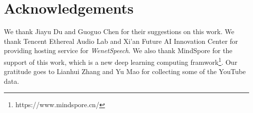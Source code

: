 \documentclass{article}
\begin{document}
\vspace{-1em}
\section{Acknowledgements}
\vspace{-1em}
We thank Jiayu Du and Guoguo Chen for their suggestions on this work.
We thank Tencent Ethereal Audio Lab and Xi'an Future AI Innovation Center for providing hosting service for \textit{WenetSpeech}. We also thank MindSpore for the support of this work, which is a new deep learning computing framwork\footnote{https://www.mindspore.cn/}.
Our gratitude goes to Lianhui Zhang and Yu Mao for collecting some of the YouTube data.


\newpage
\scriptsize


\newlength{\bibitemsep}\setlength{\bibitemsep}{.15\baselineskip plus .05\baselineskip minus .05\baselineskip}
\newlength{\bibparskip}\setlength{\bibparskip}{0pt}
\let\oldthebibliography\thebibliography
\renewcommand\thebibliography[1]{\oldthebibliography{#1}\setlength{\parskip}{\bibitemsep}\setlength{\itemsep}{\bibparskip}}


\end{document}
